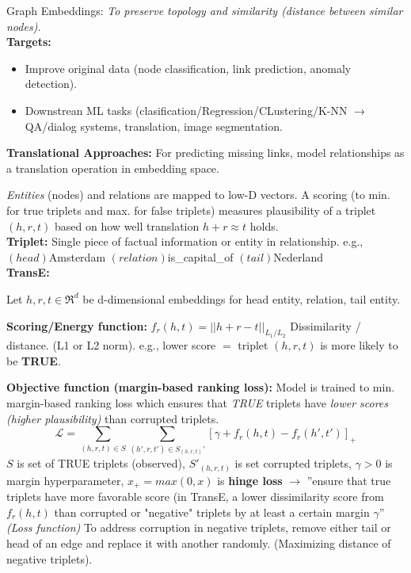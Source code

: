 \documentclass[twocolumn]{article}
\begin{document}
\begin{literaturepaper}{Graph Embeddings:}
\textit{To preserve topology and similarity (distance between similar nodes).} \\

\textbf{Targets:}
\begin{itemize}
    \item Improve original data (node classification, link prediction, anomaly detection).
    \item Downstrean ML tasks (clasification/Regression/CLustering/K-NN $\rightarrow$ QA/dialog systems, translation, image segmentation.
\end{itemize}

\textbf{Translational Approaches:} For predicting missing links, model relationships as a translation operation in embedding space.

\textit{Entities} (nodes) and relations are mapped  to low-D vectors. A scoring (to min. for true triplets and max. for false triplets) measures plausibility of a triplet $(h , r, t)$  based on how well translation $h + r \approx t$ holds. \\

\textbf{Triplet:} Single piece of factual information or entity in relationship. e.g., $(head)$Amsterdam $(relation)$is\_capital\_of $(tail)$Nederland\\


\textbf{TransE:}

Let $h, r, t \in \Re^d$ be d-dimensional embeddings for head entity, relation, tail entity.

\textbf{Scoring/Energy function:} $f_r(h,t) = ||h + r - t||_{L_1/L_2}$ Dissimilarity / distance. (L1 or L2 norm). e.g., lower score $=$ triplet $(h,r,t)$ is more likely to be \textbf{TRUE}.

\textbf{Objective function (margin-based ranking loss):} Model is trained to min. margin-based ranking loss which ensures that \textit{TRUE} triplets have \textit{lower scores (higher plausibility)} than corrupted triplets.
$$
\mathcal{L} = \sum_{(h,r,t) \in S} \sum_{(h',r,t') \in S_{(h,r,t)}'} \left[ \gamma + f_r(h,t) - f_r(h',t') \right]_{+}
$$
$S$ is set of TRUE triplets (observed), $S'_{(h,r,t)}$ is set corrupted triplets, $\gamma > 0$ is margin hyperparameter, ${x}_+ = max(0,x)$ is \textbf{hinge loss} $\rightarrow$  ''ensure that true triplets have more favorable score (in TransE, a lower dissimilarity score from $f_r(h,t)$ than corrupted or "negative" triplets by at least a certain margin $\gamma$''\\

\textit{(Loss function)} To address corruption in negative triplets, remove either tail or head of an edge and replace it with another randomly. (Maximizing distance of negative triplets).


\end{literaturepaper}
\end{document}
